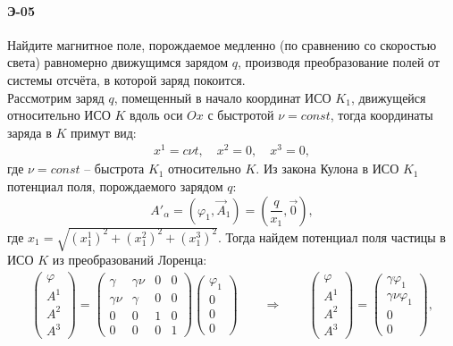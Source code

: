 



\paragraph{Э-05}
Найдите магнитное поле, порождаемое медленно (по сравнению со скоростью света) равномерно движущимся зарядом $q$, производя преобразование полей от системы отсчёта, в которой заряд покоится. \\

Рассмотрим заряд $q$, помещенный в начало координат ИСО $K_1$, движущейся относительно ИСО $K$ вдоль оси $Ox$ с быстротой $\nu=const$, тогда координаты заряда в $K$ примут вид:
\begin{gather*}
x^1 = c\nu t, \quad x^2 = 0, \quad x^3 = 0,
\end{gather*}
где $\nu = const$ -- быстрота $K_1$ относительно $K$.
Из закона Кулона в ИСО $K_1$ потенциал поля, порождаемого зарядом $q$:
$$
A'_{\alpha} = (\varphi_1, \vec{A}_1) = (\frac{q}{x_1},\vec{0}),
$$
где $x_1=\sqrt{\left(x^1_1\right)^2+\left(x^2_1\right)^2+\left(x^3_1\right)^2}$.
Тогда найдем потенциал поля частицы в ИСО $K$ из преобразований Лоренца:
\begin{gather}
\label{e-05-potlorenz}
\left(
\begin{matrix}
\varphi\\ A^1\\ A^2\\ A^3
\end{matrix}
\right) = 
\left(
\begin{matrix}
\gamma    & \gamma\nu & 0 & 0 \\
\gamma\nu &    \gamma & 0 & 0 \\
        0 &         0 & 1 & 0 \\
        0 &         0 & 0 & 1
\end{matrix}
\right)
\left(
\begin{matrix}
\varphi_1 \\ 0\\ 0\\ 0
\end{matrix}
\right) \qquad \Rightarrow \qquad
\left(
\begin{matrix}
\varphi\\ A^1\\ A^2\\ A^3
\end{matrix}
\right) =
\left(
\begin{matrix}
\gamma \varphi_1\\ \gamma \nu \varphi_1\\ 0\\ 0
\end{matrix}
\right),
\end{gather}
